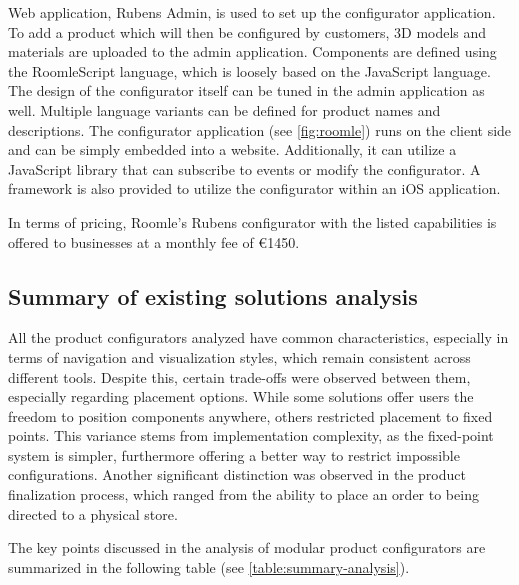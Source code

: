 Web application, Rubens Admin, is used to set up the configurator application. To add a product which will then be configured by customers, 3D models and materials are uploaded to the admin application. Components are defined using the RoomleScript language, which is loosely based on the JavaScript language. The design of the configurator itself can be tuned in the admin application as well. Multiple language variants can be defined for product names and descriptions. The configurator application (see \autoref{fig:roomle}) runs on the client side and can be simply embedded into a website. Additionally, it can utilize a JavaScript library that can subscribe to events or modify the configurator. A framework is also provided to utilize the configurator within an iOS application. \cite{RoomleDocumentation}

In terms of pricing, Roomle's Rubens configurator with the listed capabilities is offered to businesses at a monthly fee of €1450. \cite{RoomleFullLogic}

\subsection{Summary of existing solutions analysis}

All the product configurators analyzed have common characteristics, especially in terms of navigation and visualization styles, which remain consistent across different tools. Despite this, certain trade-offs were observed between them, especially regarding placement options. While some solutions offer users the freedom to position components anywhere, others restricted placement to fixed points. This variance stems from implementation complexity, as the fixed-point system is simpler, furthermore offering a better way to restrict impossible configurations.
Another significant distinction was observed in the product finalization process, which ranged from the ability to place an order to being directed to a physical store.

The key points discussed in the analysis of modular product configurators are summarized in the following table (see \autoref{table:summary-analysis}).

